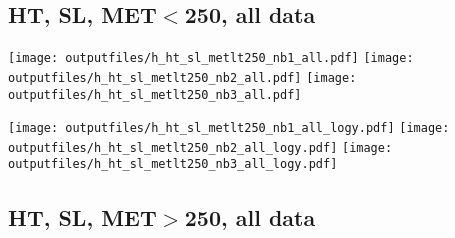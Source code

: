 \documentclass[11pt]{article}
\begin{document}







    \subsection{ HT, SL, MET$<$250, all data}

    \noindent
     \texttt{[image: outputfiles/h\_ht\_sl\_metlt250\_nb1\_all.pdf]}
     \texttt{[image: outputfiles/h\_ht\_sl\_metlt250\_nb2\_all.pdf]}
     \texttt{[image: outputfiles/h\_ht\_sl\_metlt250\_nb3\_all.pdf]}

    \noindent
     \texttt{[image: outputfiles/h\_ht\_sl\_metlt250\_nb1\_all\_logy.pdf]}
     \texttt{[image: outputfiles/h\_ht\_sl\_metlt250\_nb2\_all\_logy.pdf]}
     \texttt{[image: outputfiles/h\_ht\_sl\_metlt250\_nb3\_all\_logy.pdf]}


    \subsection{ HT, SL, MET$>$250, all data}
\end{document}
